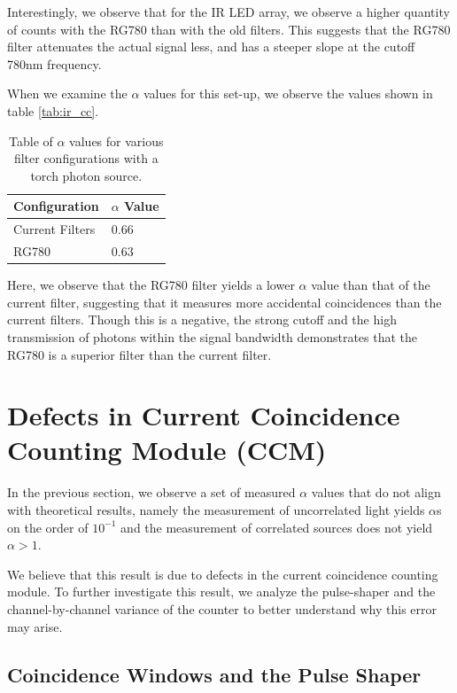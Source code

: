\documentclass[letterpaper, 11 pt]{book}
\begin{document}
Interestingly, we observe that for the IR LED array, we observe a higher quantity of counts
with the RG780 than with the old filters. This suggests that the RG780 filter attenuates
the actual signal less, and has a steeper slope at the cutoff 780nm frequency. 

When we examine the $\alpha$ values for this set-up, we observe the values shown in
table \ref{tab:ir_cc}.
\begin{table}[H]
    \centering
    \begin{tabular}{|l|l|}
    \hline
    \textbf{Configuration} & \textbf{$\alpha$ Value} \\ \hline
    Current Filters        & 0.66                   \\ \hline
    RG780                  & 0.63                   \\ \hline
    \end{tabular}
    \caption{Table of $\alpha$ values for various filter configurations with a torch photon source.}
\end{table}\label{tab:ir_cc}

Here, we observe that the RG780 filter yields a lower $\alpha$ value than that of the 
current filter, suggesting that it measures more accidental coincidences than the
current filters. Though this is a negative, the strong cutoff and the high transmission of
photons within the signal bandwidth demonstrates that the RG780 is a superior filter than the current filter.

\section{Defects in Current Coincidence Counting Module (CCM)} \label{sec:ccm_broke}

In the previous section, we observe a set of measured $\alpha$ values that do not align with
theoretical results, namely the measurement of uncorrelated light yields $\alpha$s on the order of $10^{-1}$
and the measurement of correlated sources does not yield $\alpha > 1$.

We believe that this result is due to defects in the current coincidence counting module. To further
investigate this result, we analyze the pulse-shaper and the channel-by-channel variance of the counter
to better understand why this error may arise.

\subsection{Coincidence Windows and the Pulse Shaper}
\end{document}

